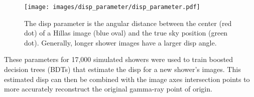 


\begin{figure}[tb]
  \centering
  \texttt{[image: images/disp\_parameter/disp\_parameter.pdf]}
  \caption[Angular Reconstruction Disp]{
    The disp parameter is the angular distance between the center (red dot) of a Hillas image (blue oval) and the true sky position (green dot).
    Generally, longer shower images have a larger disp angle.
  }
  \label{fig:dispdiagram}
\end{figure}

These parameters for 17,000 simulated showers were used to train boosted decision trees (BDTs) that estimate the disp for a new shower's images.
This estimated disp can then be combined with the image axes intersection points to more accurately reconstruct the original gamma-ray point of origin.

